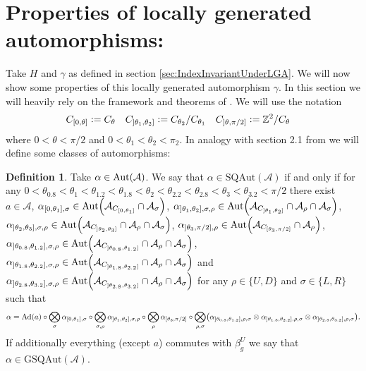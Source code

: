 \documentclass[12pt,a4paper,twoside]{article}
\newcommand{\defeq}{\vcentcolon=}
\let\originalleft\left
\let\originalright\right
\renewcommand{\left}{\mathopen{}\mathclose\bgroup\originalleft}
\renewcommand{\right}{\aftergroup\egroup\originalright}
\newcommand{\ZZ}{\mathbb Z}
\renewcommand{\AA}{\mathcal A}
\newcommand{\Ad}[1]{\textrm{Ad}\left(#1\right)}
\newcommand{\Aut}[1]{\textrm{Aut}\left(#1\right)}
\theoremstyle{definition}
\newtheorem{definition}[theorem]{Definition}
\numberwithin{equation}{section}
\begin{document}
\section{Properties of locally generated automorphisms:}
 Take $H$ and $\gamma$ as defined in section \ref{sec:IndexInvariantUnderLGA}. We will now show some properties of this locally generated automorphism $\gamma$. In this section we will heavily rely on the framework and theorems of \cite{ogata2021h3gmathbb}. We will use the notation
 \begin{align}
 	C_{[0,\theta]}&\defeq C_{\theta}&C_{]\theta_1,\theta_2]}&\defeq C_{\theta_2}/C_{\theta_1}&C_{]\theta,\pi/2]}&\defeq \ZZ^2/C_{\theta}
 \end{align}
 where $0<\theta<\pi/2$ and $0<\theta_1<\theta_2<\pi_2$. In analogy with section 2.1 from \cite{ogata2021h3gmathbb} we will define some classes of automorphisms:
 \begin{definition}
 	Take $\alpha\in\Aut{\AA}$. We say that $\alpha\in\textrm{SQAut}(\AA)$ if and only if for any $0<\theta_{0.8}<\theta_{1}<\theta_{1.2}<\theta_{1.8}<\theta_{2}<\theta_{2.2}<\theta_{2.8}<\theta_3<\theta_{3.2}<\pi/2$ there exist $a\in\AA$, $\alpha_{[0,\theta_1], \sigma}\in\Aut{\AA_{C_{[0,\theta_1]}}\cap\AA_\sigma}$, $\alpha_{]\theta_1,\theta_2],\sigma,\rho}\in\Aut{\AA_{C_{]\theta_1,\theta_2]}}\cap\AA_{\rho}\cap\AA_{\sigma}}$, $\alpha_{]\theta_2,\theta_3],\sigma,\rho}\in\Aut{\AA_{C_{]\theta_2,\theta_3]}}\cap\AA_{\rho}\cap\AA_{\sigma}}$, $\alpha_{]\theta_3,\pi/2],\rho}\in\Aut{\AA_{C_{[\theta_3,\pi/2]}}\cap\AA_\rho}$, $\alpha_{]\theta_{0.8},\theta_{1.2}],\sigma,\rho}\in\Aut{\AA_{C_{]\theta_{0.8},\theta_{1.2}]}}\cap\AA_{\rho}\cap\AA_{\sigma}}$, $\alpha_{]\theta_{1.8},\theta_{2.2}],\sigma,\rho}\in\Aut{\AA_{C_{]\theta_{1.8},\theta_{2.2}]}}\cap\AA_{\rho}\cap\AA_{\sigma}}$ and  $\alpha_{]\theta_{2.8},\theta_{3.2}],\sigma,\rho}\in\Aut{\AA_{C_{]\theta_{2.8},\theta_{3.2}]}}\cap\AA_{\rho}\cap\AA_{\sigma}}$ for any $\rho\in\{U,D\}$ and $\sigma\in\{L,R\}$ such that
 	\begin{equation}
 		\alpha=\Ad{a}\circ \bigotimes_{\sigma}\alpha_{[0,\theta_1],\sigma}\circ\bigotimes_{\sigma,\rho}\alpha_{]\theta_1,\theta_2],\sigma,\rho}\circ\bigotimes_{\rho}\alpha_{[\theta_3,\pi/2]}\circ\bigotimes_{\rho,\sigma}\left(\alpha_{]\theta_{0.8},\theta_{1.2}],\rho,\sigma}\otimes\alpha_{]\theta_{1.8},\theta_{2.2}],\rho,\sigma}\otimes\alpha_{]\theta_{2.8},\theta_{3.2}],\rho,\sigma} \right).
 	\end{equation}
 	If additionally everything (except $a$) commutes with $\beta_g^U$ we say that $\alpha\in \textrm{GSQAut}(\AA)$.
 \end{definition}
\end{document}

